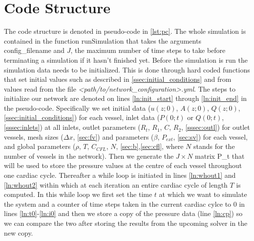 \documentclass[a4paper, oneside]{discothesis}
\begin{document}
							\section{Code Structure} \label{sec:cs}
							The code structure is denoted in pseudo-code in \autoref{lst:pc}.
							The whole simulation is contained in the function runSimulation that takes the arguments config\_filename and $J$, the maximum number of time steps to take before terminating a simulation if it hasn't finished yet.
							Before the simulation is run the simulation data needs to be initialized.
							This is done through hard coded functions that set initial values such as described in \autoref{ssec:initial_conditions} and from values read from the file \emph{<path/to/network\_configuration>.yml}.
							The steps to initialize our network are denoted on lines \ref{ln:init_start} through \ref{ln:init_end} in the pseudo-code.
							Specifically we set initial data ($u(z;0)$, $A(z;0)$, $Q(z;0)$, \autoref{ssec:initial_conditions}) for each vessel, inlet data ($P(0;t)$ or $Q(0;t)$, \autoref{sssec:inlets}) at all inlets, outlet parameters ($R_t$, $R_1$, $C$, $R_2$, \autoref{sssec:outl}) for outlet vessels, mesh sizes ($\Delta x$, \autoref{sec:fv}) and parameters ($\beta$, $P_{ext}$, \autoref{sec:sv}) for each vessel, and global parameters ($\rho$, $T$, $C_{CFL}$, $N$, \autoref{sec:b},\autoref{sec:cfl}, where $N$ stands for the number of vessels in the network).
							Then we generate the $J \times N$ matrix P\_t that will be used to store the pressure values at the centre of each vessel throughout one cardiac cycle.
							Thereafter a while loop is initiated in lines \ref{ln:whout1} and \ref{ln:whout2} within which at each iteration an entire cardiac cycle of length $T$ is computed.
							In this while loop we first set the time $t$ at which we want to simulate the system and a counter of time steps taken in the current cardiac cylce to $0$ in lines \ref{ln:t0}-\ref{ln:i0} and then we store a copy of the pressure data (line \ref{ln:cp}) so we can compare the two after storing the results from the upcoming solver in the new copy.
\end{document}
